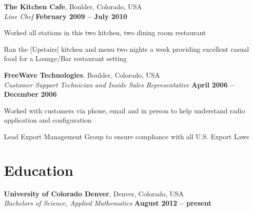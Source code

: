 \documentclass[margin,line]{resume}
\begin{document}
\begin{resume}
 \textbf{The Kitchen Cafe}, Boulder, Colorado, USA \vspace{1mm}\\\vspace{1mm}%
    \textsl{Line Chef} \hfill \textbf{February 2009 -- July 2010} \vspace{-3mm}\\\vspace{-1mm}%
	\begin{list2}
	\item Worked all stations in this two kitchen, two dining room restaurant
	\item Ran the [Upstairs] kitchen and menu two nights a week providing excellent casual food for a Lounge/Bar restaurant setting
	\end{list2}

    \textbf{FreeWave Technologies}, Boulder, Colorado, USA \vspace{1mm}\\\vspace{1mm}%
    \textsl{Customer Support Technician and Inside Sales Representative} \hfill \textbf{April 2006 -- December 2006} \vspace{-3mm}\\\vspace{-1mm}%
	\begin{list2}
	\item Worked with customers via phone, email and in person to help understand radio application and configuration
	\item Lead Export Management Group to ensure compliance with all U.S. Export Laws
	\end{list2}

    \section{\mysidestyle Education}

\textbf{University of Colorado Denver}, Denver, Colorado, USA \vspace{1mm}\\\vspace{1mm}%
    \textsl{Bachelors of Science, Applied Mathematics} \hfill \textbf{ August 2012 -- present}\vspace{-3mm}\\\vspace{-1mm}%


\end{resume}
\end{document}
